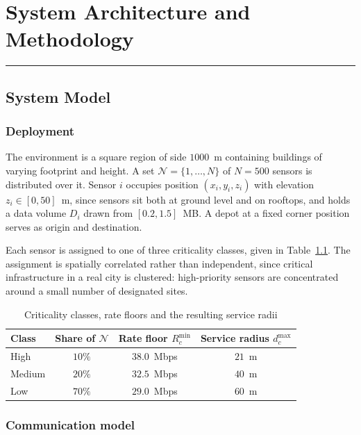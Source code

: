 \chapter{System Architecture and Methodology}
\label{chap:method}
\noindent \rule{6.6in}{0.01in}
\minitoc
\newpage

\section{System Model}

\subsection{Deployment}

The environment is a square region of side $1000$~m containing buildings of varying footprint and height. A set $\mathcal{N} = \{1,\dots,N\}$ of $N = 500$ sensors is distributed over it. Sensor $i$ occupies position $(x_i, y_i, z_i)$ with elevation $z_i \in [0, 50]$~m, since sensors sit both at ground level and on rooftops, and holds a data volume $D_i$ drawn from $[0.2, 1.5]$~MB. A depot at a fixed corner position serves as origin and destination.

Each sensor is assigned to one of three criticality classes, given in Table~\ref{tab:classes}. The assignment is spatially correlated rather than independent, since critical infrastructure in a real city is clustered: high-priority sensors are concentrated around a small number of designated sites.

\begin{table}[!ht]
\centering
\caption{Criticality classes, rate floors and the resulting service radii}
\label{tab:classes}
\begin{tabular}{lccc}
\toprule
\textbf{Class} & \textbf{Share of $\mathcal{N}$} & \textbf{Rate floor $R^{\min}_c$} & \textbf{Service radius $d^{\max}_c$} \\
\midrule
High & $10\%$ & $38.0$~Mbps & $21$~m \\
Medium & $20\%$ & $32.5$~Mbps & $40$~m \\
Low & $70\%$ & $29.0$~Mbps & $60$~m \\
\bottomrule
\end{tabular}
\end{table}

\subsection{Communication model}

